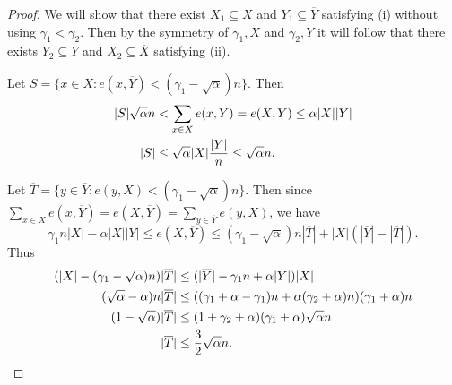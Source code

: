 \documentclass[oneside,12pt]{memoir}
\newcommand{\g}{\gamma}
\begin{document}
\begin{proof} We will show that there exist $X_{1}\subseteq X$ and
$Y_{1}\subseteq\overline{Y}$ satisfying (i) without
using $\gamma_{1}<\gamma_{2}$. Then by the symmetry of $\gamma_{1},X$
and $\gamma_{2},Y$ it will follow that there exists $Y_{2}\subseteq Y$
and $X_{2}\subseteq\overline{X}$ satisfying (ii). 


Let $S=\{x\in X:e(x,\overline{Y})<(\gamma_{1}-\sqrt{\alpha})n\}.$
Then 
\begin{align}
|S|\sqrt{\alpha}n&<\sum_{x\in X}e(x,Y)=e(X,Y)\leq\alpha|X||Y| \notag \\
|S|&\leq\sqrt{\alpha}|X|\frac{\left\vert Y\right\vert }{n}\leq\sqrt{\alpha}n.\label{S}
\end{align}

Let $\overline{T}=\{y\in\overline{Y}:e(y,X)<(\gamma_{1}-\sqrt{\alpha})n\}$. Then since $\sum_{x\in X} e(x,\overline{Y}) =e(X,\overline{Y})= \sum_{y\in\overline{Y}}e(y,X)$, we have
\[
\gamma_{1}n|X|-\alpha|X||Y| \le e(X,\overline{Y})\le (\gamma_{1}-\sqrt{\alpha})n |\overline{T}|+|X|(|\overline{Y}|-|\overline{T}|).
\]
Thus
\begin{align}
(|X|-(\gamma_1-\sqrt\alpha)n)|\overline T| &\le
(|\overline Y| -\gamma_1n+\alpha|Y|)|X| \notag \\
(\sqrt\alpha-\alpha)n|\overline T| &\le 
((\gamma_1+\alpha-\gamma_1)n+\alpha(\gamma_2+\alpha)n)(\gamma_1+\alpha)n \notag\\
(1-\sqrt\alpha)|\overline T| &\le
(1+\gamma_2+\alpha)(\gamma_1+\alpha)\sqrt\alpha n \notag\\
|\overline T|&\le \frac{3}{2}\sqrt\alpha n. \label{T}
\end{align}


\end{proof}
\end{document}
